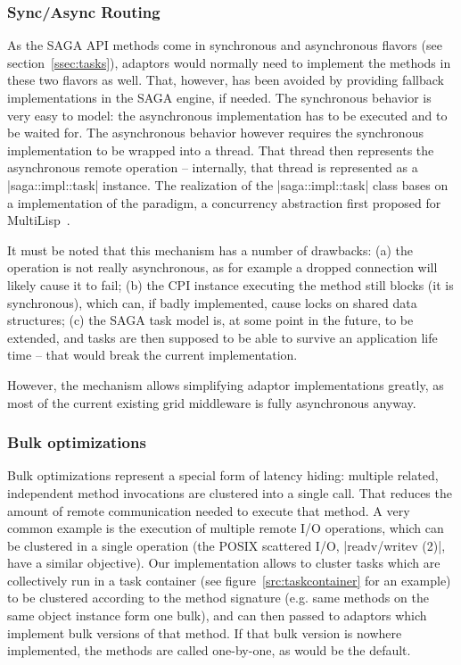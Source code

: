 \subsubsection{Sync/Async Routing}

As the SAGA API methods come in synchronous and asynchronous flavors
(see section~\ref{ssec:tasks}), adaptors would normally need to implement
the methods in these two flavors as well.  That, however, has been
avoided by providing fallback implementations in the
SAGA engine, if needed.   The synchronous behavior is very easy 
to model: the asynchronous implementation has to be executed and to be waited
for.  The asynchronous behavior however requires the synchronous
implementation to be wrapped into a thread.  That thread then
represents the asynchronous remote operation -- internally, that
thread is represented as a |saga::impl::task| instance.
The realization of the |saga::impl::task| class bases on a
implementation of the  paradigm, a concurrency abstraction 
first proposed for MultiLisp~\cite{futures}.  

It must be noted that this mechanism has a number of drawbacks:  (a)
the operation is not really asynchronous, as for example a dropped
connection will likely cause it to fail; (b) the CPI instance
executing the method still blocks (it is synchronous), which can, if
badly implemented, cause locks on shared data structures; (c) the SAGA
task model is, at some point in the future, to be extended, and tasks
are then supposed to be able to survive an application life time --
that would break the current implementation.

However, the mechanism allows simplifying adaptor implementations
greatly, as most of the current existing grid middleware is 
fully asynchronous anyway.



\subsubsection{Bulk optimizations}
\label{ssec:bulks}

Bulk optimizations represent a special form of latency hiding:
multiple related, independent method invocations are clustered into a
single call.  That reduces the amount of remote communication needed
to execute that method.  A very common example is the execution of
multiple remote I/O operations, which can be clustered in a single
operation (the POSIX scattered I/O, |readv/writev (2)|, have a similar
objective).  Our implementation allows to cluster tasks which are
collectively run in a task container (see
figure~\ref{src:taskcontainer} for an example) to be clustered according to the
method signature (e.g. same methods on the same object instance form
one bulk), and can then passed to adaptors which implement bulk
versions of that method.  If that bulk version is nowhere implemented,
the methods are called one-by-one, as would be the default.


